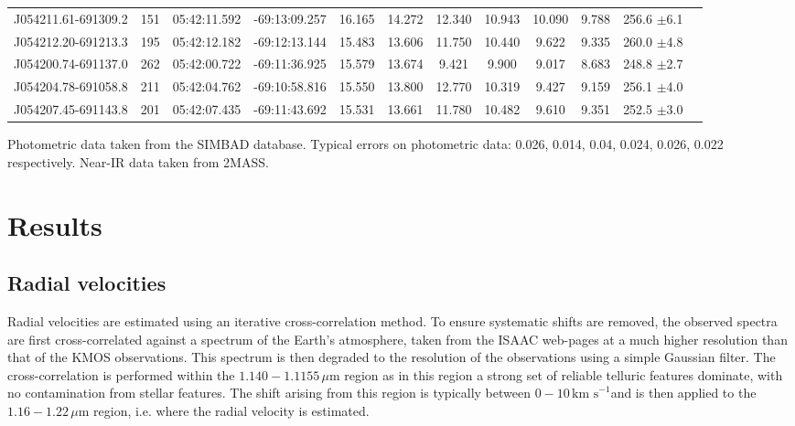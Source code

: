 \documentclass[useAMS,usenatbib]{mn2e}
\def\kms{$\mbox{km s}^{-1}$}
\begin{document}
\begin{table}
\begin{center}
\begin{tabular}{lrcccccccccl}
J054211.61-691309.2 & 151 & 05:42:11.592 & -69:13:09.257 & 16.165 & 14.272 & 12.340 & 10.943 & 10.090 & 9.788 &  256.6 $\pm$6.1\\
J054212.20-691213.3 & 195 & 05:42:12.182 & -69:12:13.144 & 15.483 & 13.606 & 11.750 & 10.440 &  9.622 & 9.335 &  260.0 $\pm$4.8\\
J054200.74-691137.0 & 262 & 05:42:00.722 & -69:11:36.925 & 15.579 & 13.674 &  9.421 &  9.900 &  9.017 & 8.683 &  248.8 $\pm$2.7\\
J054204.78-691058.8 & 211 & 05:42:04.762 & -69:10:58.816 & 15.550 & 13.800 & 12.770 & 10.319 &  9.427 & 9.159 &  256.1 $\pm$4.0\\
J054207.45-691143.8 & 201 & 05:42:07.435 & -69:11:43.692 & 15.531 & 13.661 & 11.780 & 10.482 &  9.610 & 9.351 &  252.5 $\pm$3.0\\



\hline
\end{tabular}
\end{center}
{Photometric data taken from the SIMBAD database. Typical errors on photometric data:
0.026, 0.014, 0.04, 0.024, 0.026, 0.022 respectively.
Near-IR data taken from 2MASS.}
\end{table}


\section{Results} %
\label{sec:results}


\subsection{Radial velocities} %
\label{sub:radial_velocities}
Radial velocities are estimated using an iterative cross-correlation method.
To ensure systematic shifts are removed, the observed spectra are first cross-correlated against a spectrum of the Earth's atmosphere, taken from the ISAAC web-pages at a much higher resolution than that of the KMOS observations.
This spectrum is then degraded to the resolution of the observations using a simple Gaussian filter.
The cross-correlation is performed within the $1.140-1.1155\,\mu$m region as in this region a strong set of reliable telluric features dominate, with no contamination from stellar features.
The shift arising from this region is typically between $0-10\,$\kms and is then applied to the $1.16-1.22\,\mu$m region, i.e. where the radial velocity is estimated.
\end{document}

